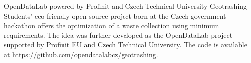 \begin{cventries}
  
    \cventry
    {OpenDataLab powered by Profinit and Czech Technical University} %
    {Geotrashing} %
    {} %
    {} %
    {
       Students' eco-friendly open-source project born at the Czech government hackathon offers the optimization of a waste collection using minimum requirements. The idea was further developed as the OpenDataLab project supported by Profinit EU and Czech Technical University. The code is available at \hyperlink{https://github.com/opendatalabcz/geotrashing}{https://github.com/opendatalabcz/geotrashing}. 
    }


\end{cventries}